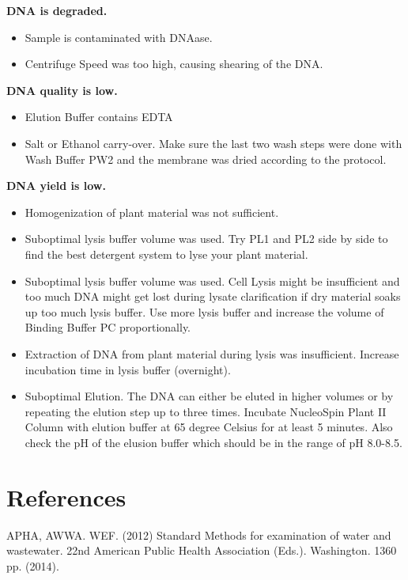 \documentclass[12pt]{../SOP3_alpha}\usepackage[]{graphicx}\usepackage[]{color}
\begin{document}
\NP \textbf{DNA is degraded.}
\begin{itemize}
  \item Sample is contaminated with DNAase.
  \item Centrifuge Speed was too high, causing shearing of the DNA.
\end{itemize}

\NP \textbf{DNA quality is low.}
\begin{itemize}
  \item Elution Buffer contains EDTA
  \item Salt or Ethanol carry-over. Make sure the last two wash steps were done with Wash Buffer PW2 and the membrane was dried according to the protocol.
\end{itemize}

\NP \textbf{DNA yield is low.}
\begin{itemize}
  \item Homogenization of plant material was not sufficient. 
  \item Suboptimal lysis buffer volume was used. Try PL1 and PL2 side by side to find the best detergent system to lyse your plant material. 
  \item Suboptimal lysis buffer volume was used. Cell Lysis might be insufficient and too much DNA might get lost during lysate clarification if dry material soaks up too much lysis buffer. Use more lysis buffer and increase the volume of Binding Buffer PC proportionally.
  \item Extraction of DNA from plant material during lysis was insufficient. Increase incubation time in lysis buffer (overnight).
  \item Suboptimal Elution. The DNA can either be eluted in higher volumes or by repeating the elution step up to three times. Incubate NucleoSpin Plant II Column with elution buffer at 65 degree Celsius for at least 5 minutes.
Also check the pH of the elusion buffer which should be in the range of pH 8.0-8.5.
\end{itemize}

\section{References}

\NP APHA, AWWA. WEF. (2012) Standard Methods for examination of water and wastewater. 22nd American Public Health Association (Eds.). Washington. 1360 pp. (2014).
\end{document}
